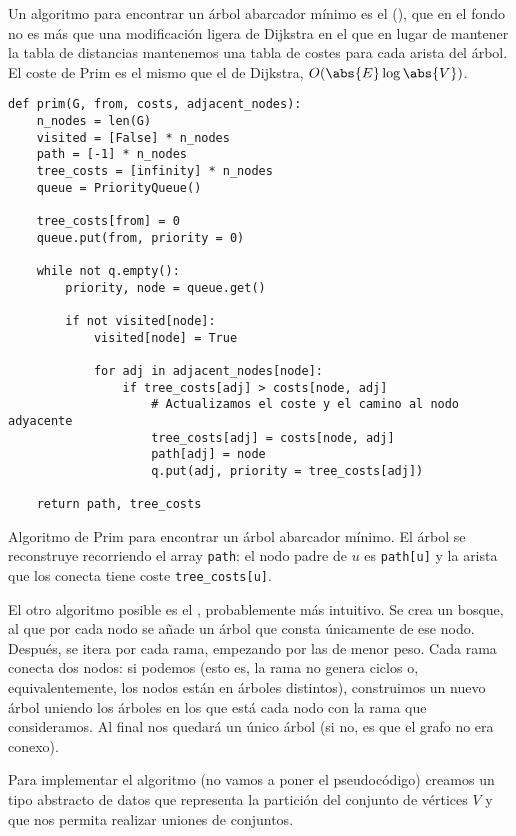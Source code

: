 \documentclass[palatino, nochap]{apuntes}
\begin{document}
Un algoritmo para encontrar un árbol abarcador mínimo es el  (), que en el fondo no es más que una modificación ligera de Dijkstra en el que en lugar de mantener la tabla de distancias mantenemos una tabla de costes para cada arista del árbol. El coste de Prim es el mismo que el de Dijkstra, $O(\abs{E} \log \abs{V})$.


\begin{listing}[hbtp]
\begin{verbatim}
def prim(G, from, costs, adjacent_nodes):
	n_nodes = len(G)
	visited = [False] * n_nodes
	path = [-1] * n_nodes
	tree_costs = [infinity] * n_nodes
	queue = PriorityQueue()

	tree_costs[from] = 0
	queue.put(from, priority = 0)

	while not q.empty():
		priority, node = queue.get()

		if not visited[node]:
			visited[node] = True

			for adj in adjacent_nodes[node]:
				if tree_costs[adj] > costs[node, adj]
					# Actualizamos el coste y el camino al nodo adyacente
					tree_costs[adj] = costs[node, adj]
					path[adj] = node
					q.put(adj, priority = tree_costs[adj])

	return path, tree_costs
\end{verbatim}
\caption{Algoritmo de Prim para encontrar un árbol abarcador mínimo. El árbol se reconstruye recorriendo el array \texttt{path}: el nodo padre de $u$ es \texttt{path[u]} y la arista que los conecta tiene coste \texttt{tree\_costs[u]}.}
\label{lst:Prim}
\end{listing}

El otro algoritmo posible es el , probablemente más intuitivo. Se crea un bosque, al que por cada nodo se añade un árbol que consta únicamente de ese nodo. Después, se itera por cada rama, empezando por las de menor peso. Cada rama conecta dos nodos: si podemos (esto es, la rama no genera ciclos o, equivalentemente, los nodos están en árboles distintos), construimos un nuevo árbol uniendo los árboles en los que está cada nodo con la rama que consideramos. Al final nos quedará un único árbol (si no, es que el grafo no era conexo).

Para implementar el algoritmo (no vamos a poner el pseudocódigo) creamos un tipo abstracto de datos que representa la partición del conjunto de vértices $V$ y que nos permita realizar uniones de conjuntos.
\end{document}
